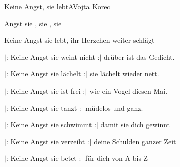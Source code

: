 \begin{song}{Keine Angst, sie lebt}{A}{Vojta Korec}

\begin{SBVerse}

 Angst sie , sie , sie 

Keine Angst sie lebt, ihr Herzchen weiter schlägt

\end{SBVerse}

\begin{SBVerse}

$|$: Keine Angst sie weint nicht :$|$ drüber ist das Gedicht.

\end{SBVerse}

\begin{SBVerse}

$|$: Keine Angst sie lächelt :$|$ sie lächelt wieder nett.

\end{SBVerse}

\begin{SBVerse}

$|$: Keine Angst sie ist frei :$|$ wie ein Vogel diesen Mai.

\end{SBVerse}

\begin{SBVerse}

$|$: Keine Angst sie tanzt :$|$ müdelos und ganz.

\end{SBVerse}

\begin{SBVerse}

$|$: Keine Angst sie schwimmt :$|$ damit sie dich gewinnt

\end{SBVerse}

\begin{SBVerse}

$|$: Keine Angst sie verzeiht :$|$ deine Schulden ganzer Zeit

\end{SBVerse}

\begin{SBVerse}

$|$: Keine Angst sie betet :$|$ für dich von A bis Z

\end{SBVerse}

\end{song}


